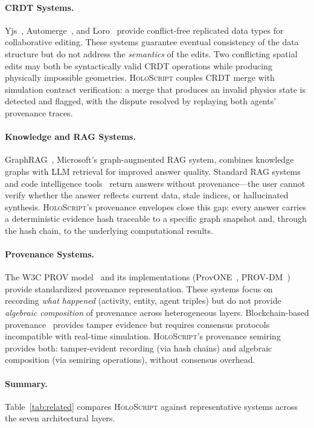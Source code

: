 \documentclass[sigchi-a]{acmart}
\newcommand{\holoscript}{\textsc{HoloScript}}
\begin{document}
\paragraph{CRDT Systems.}
Yjs~\cite{yjs2024}, Automerge~\cite{automerge2024}, and
Loro~\cite{loro2024} provide conflict-free replicated data types for
collaborative editing. These systems guarantee eventual consistency of
the data structure but do not address the \emph{semantics} of the edits.
Two conflicting spatial edits may both be syntactically valid CRDT
operations while producing physically impossible geometries.
\holoscript{} couples CRDT merge with simulation contract verification:
a merge that produces an invalid physics state is detected and flagged,
with the dispute resolved by replaying both agents' provenance traces.

\paragraph{Knowledge and RAG Systems.}
GraphRAG~\cite{edge2024graphrag}, Microsoft's graph-augmented RAG system,
combines knowledge graphs with LLM retrieval for improved answer quality.
Standard RAG systems~\cite{lewis2020rag} and code intelligence
tools~\cite{codeintelligence2024} return answers without provenance---the
user cannot verify whether the answer reflects current data, stale indices,
or hallucinated synthesis.
\holoscript{}'s provenance envelopes close this gap: every answer carries
a deterministic evidence hash traceable to a specific graph snapshot and,
through the hash chain, to the underlying computational results.

\paragraph{Provenance Systems.}
The W3C PROV model~\cite{w3c-prov} and its implementations
(ProvONE~\cite{provone2015}, PROV-DM~\cite{moreau2013prov}) provide
standardized provenance representation. These systems focus on recording
\emph{what happened} (activity, entity, agent triples) but do not
provide \emph{algebraic composition} of provenance across heterogeneous
layers. Blockchain-based provenance~\cite{blockchain-agents2025} provides
tamper evidence but requires consensus protocols incompatible with
real-time simulation.
\holoscript{}'s provenance semiring provides both: tamper-evident recording
(via hash chains) and algebraic composition (via semiring operations),
without consensus overhead.

\paragraph{Summary.}
Table~\ref{tab:related} compares \holoscript{} against representative
systems across the seven architectural layers.
\end{document}

